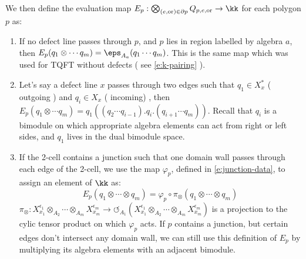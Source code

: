\begin{defectfiguresetup}
We then define the evaluation map $E_p: \bigotimes_{(e,\mathrm{or}) \in \partial p} Q_{p,e,\mathrm{or}} \rightarrow \kk $ for each polygon $p$ as:
\begin{enumerate}
	\item[I.] If no defect line passes through $p$, and $p$ lies in region labelled by algebra $a$, then $E_p(q_1 \otimes \cdots q_m) = \eps_{A_a}(q_1 \cdots q_m)$. This is the same map which was used for TQFT without defects ( see  \eqref{e:k-pairing} ).
	\item[II.] Let's say a defect line $x$  passes through two edges such that $q_1 \in X_x^*$ ( outgoing ) and $q_i \in X_x$ ( incoming) , then $E_p(q_1 \otimes \cdots q_m) = q_1 ( (q_2 \cdots q_{i-1}).q_i.(q_{i+1}\cdots q_m))$. Recall that $q_i$ is a bimodule on which appropriate algebra elements can act from right or left sides, and $q_1$ lives in the dual bimodule space.
	\item[III.] If the 2-cell contains a junction such that one domain wall passes through each edge of the 2-cell, we use the map $\varphi_p$, defined in \eqref{e:junction-data}, to assign an element of $\kk$ as:
	\begin{equation}
		E_p(q_1 \otimes \cdots \otimes q_m)=\varphi_p \circ \pi_\otimes(q_1 \otimes \cdots \otimes q_m)
	\end{equation}
	$\pi_\otimes: X_{x_1}^{\epsilon_1} \otimes_{A_2} \cdots \otimes_{A_m}  X_{x_m}^{\epsilon_m} \rightarrow \circlearrowleft_{A_1} (X_{x_1}^{\epsilon_1} \otimes_{A_2} \cdots \otimes_{A_m}  X_{x_m}^{\epsilon_m}) $ is a projection to the cylic tensor product on which $\varphi_p$ acts. If $p$ contains a junction, but certain edges don't intersect any domain wall, we can still use this definition of $E_p$ by multiplying its algebra elements with an adjacent bimodule.
\end{enumerate}


\end{defectfiguresetup}
